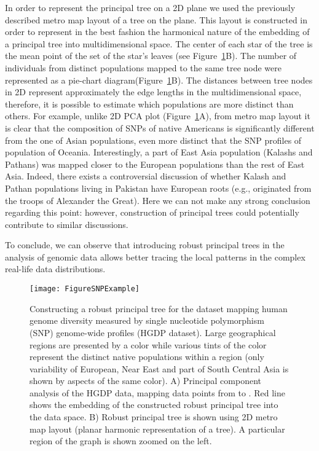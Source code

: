 \documentclass[graybox]{archivesofdatascience}
\begin{document}
In order to represent the principal tree on a 2D plane we used the previously described metro map layout of a tree on the plane\citep{gorban2008beyond,GorbanPMaGiP}. This layout is constructed in order to represent in the best fashion the harmonical nature of the embedding of a principal tree into multidimensional space. 
The center of each star of the tree is the mean point of the set of the star's leaves (see Figure~\ref{GeoSNPExample}B). 
The number of individuals from distinct populations mapped to the same tree node were represented as a pie-chart diagram(Figure~\ref{GeoSNPExample}B).
The distances between tree nodes in 2D represent approximately the edge lengths in the multidimensional space, 
therefore, it is possible to estimate which populations are more distinct than others. 
For example, unlike 2D PCA plot (Figure~\ref{GeoSNPExample}A), from metro map layout it is clear that the composition of SNPs of native Americans is significantly different 
from the one of Asian populations, even more distinct that the SNP profiles of population of Oceania. 
Interestingly, a part of East Asia population (Kalashs and Pathans) was mapped closer to the European populations than the rest of East Asia. 
Indeed, there exists a controversial discussion of whether Kalash and Pathan populations living in Pakistan have European roots 
(e.g., originated from the troops of Alexander the Great)\citep{Firasat2007,wood2001footsteps}. 
Here we can not make any strong conclusion regarding this point: however, construction of principal trees could potentially contribute to similar discussions.

To conclude, we can observe that introducing robust principal trees in the analysis of genomic data allows better tracing the local patterns in the complex real-life data distributions.

\begin{figure}[tbp]
\texttt{[image: FigureSNPExample]}
\caption{Constructing a robust principal tree for the dataset mapping human genome diversity measured by single nucleotide polymorphism (SNP) genome-wide profiles (HGDP dataset). Large geographical regions are presented by a color while various tints of the color represent the distinct native populations within a region (only variability of European, Near East and part of South Central Asia is shown by aspects of the same color). A) Principal component analysis of the HGDP data, mapping data points from  to . Red line shows the embedding of the constructed robust principal tree into the data space. B) Robust principal tree is shown using 2D metro map layout (planar harmonic representation of a tree). A particular region of the graph is shown zoomed on the left.}
\label{GeoSNPExample}       \end{figure}
\end{document}

